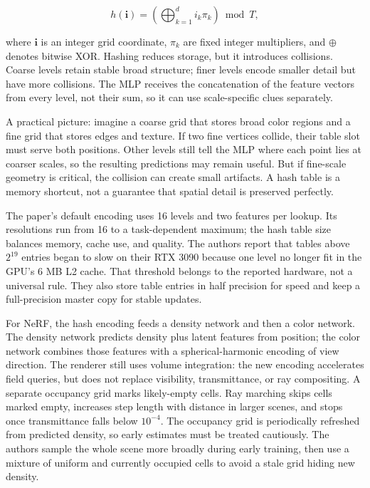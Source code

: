 \[h(\mathbf{i})=\left(\bigoplus_{k=1}^{d}i_k\pi_k\right)\bmod T,\]

where \(\mathbf{i}\) is an integer grid coordinate, \(\pi_k\) are fixed integer multipliers, and \(\oplus\) denotes bitwise XOR. Hashing reduces storage, but it introduces collisions. Coarse levels retain stable broad structure; finer levels encode smaller detail but have more collisions. The MLP receives the concatenation of the feature vectors from every level, not their sum, so it can use scale-specific clues separately.

A practical picture: imagine a coarse grid that stores broad color regions and a fine grid that stores edges and texture. If two fine vertices collide, their table slot must serve both positions. Other levels still tell the MLP where each point lies at coarser scales, so the resulting predictions may remain useful. But if fine-scale geometry is critical, the collision can create small artifacts. A hash table is a memory shortcut, not a guarantee that spatial detail is preserved perfectly.

The paper's default encoding uses 16 levels and two features per lookup. Its resolutions run from 16 to a task-dependent maximum; the hash table size balances memory, cache use, and quality. The authors report that tables above \(2^{19}\) entries began to slow on their RTX 3090 because one level no longer fit in the GPU's 6 MB L2 cache. That threshold belongs to the reported hardware, not a universal rule. They also store table entries in half precision for speed and keep a full-precision master copy for stable updates.

For NeRF, the hash encoding feeds a density network and then a color network. The density network predicts density plus latent features from position; the color network combines those features with a spherical-harmonic encoding of view direction. The renderer still uses volume integration: the new encoding accelerates field queries, but does not replace visibility, transmittance, or ray compositing. A separate occupancy grid marks likely-empty cells. Ray marching skips cells marked empty, increases step length with distance in larger scenes, and stops once transmittance falls below \(10^{-4}\). The occupancy grid is periodically refreshed from predicted density, so early estimates must be treated cautiously. The authors sample the whole scene more broadly during early training, then use a mixture of uniform and currently occupied cells to avoid a stale grid hiding new density.

